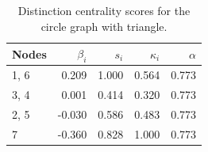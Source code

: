 \begin{table}
\centering
\caption{\label{tab:circletriangle}Distinction centrality scores for the circle graph with triangle.}
\centering
\begin{tabular}[t]{lrrrr}
\toprule
Nodes & $\beta_i$ & $s_i$ & $\kappa_i$ & $\alpha$\\
\midrule
1, 6 & 0.209 & 1.000 & 0.564 & 0.773\\
3, 4 & 0.001 & 0.414 & 0.320 & 0.773\\
2, 5 & -0.030 & 0.586 & 0.483 & 0.773\\
7 & -0.360 & 0.828 & 1.000 & 0.773\\
\bottomrule
\end{tabular}
\end{table}
